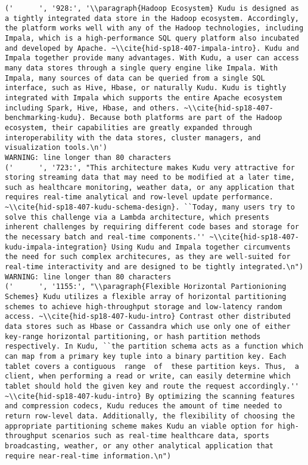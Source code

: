\begin{tiny}
\begin{verbatim}
('      ', '928:', '\\paragraph{Hadoop Ecosystem} Kudu is designed as a tightly integrated data store in the Hadoop ecosystem. Accordingly, the platform works well with any of the Hadoop technologies, including Impala, which is a high-performance SQL query platform also incubated and developed by Apache. ~\\cite{hid-sp18-407-impala-intro}. Kudu and Impala together provide many advantages. With Kudu, a user can access many data stores through a single query engine like Impala. With Impala, many sources of data can be queried from a single SQL interface, such as Hive, Hbase, or naturally Kudu. Kudu is tightly integrated with Impala which supports the entire Apache ecosystem including Spark, Hive, Hbase, and others. ~\\cite{hid-sp18-407-benchmarking-kudu}. Because both platforms are part of the Hadoop ecosystem, their capabilities are greatly expanded through interoperability with the data stores, cluster managers, and visualization tools.\n')
WARNING: line longer than 80 characters
('      ', '723:', "This architecture makes Kudu very attractive for storing streaming data that may need to be modified at a later time, such as healthcare monitoring, weather data, or any application that requires real-time analytical and row-level update performance. ~\\cite{hid-sp18-407-kudu-schema-design}. ``Today, many users try to solve this challenge via a Lambda architecture, which presents inherent challenges by requiring different code bases and storage for the necessary batch and real-time components.'' ~\\cite{hid-sp18-407-kudu-impala-integration} Using Kudu and Impala together circumvents the need for such complex architecures, as they are well-suited for real-time interactivity and are designed to be tightly integrated.\n")
WARNING: line longer than 80 characters
('      ', '1155:', "\\paragraph{Flexible Horizontal Partionioning Schemes} Kudu utilizes a flexible array of horizontal partitioning schemes to achieve high-throughput storage and low-latency random access. ~\\cite{hid-sp18-407-kudu-intro} Contrast other distributed data stores such as Hbase or Cassandra which use only one of either key-range horizontal partitioning, or hash partition methods respectively. In Kudu, ``the partition schema acts as a function which can map from a primary key tuple into a binary partition key. Each tablet covers a contiguous  range  of  these partition keys. Thus,  a client, when performing a read or write, can easily determine which tablet should hold the given key and route the request accordingly.'' ~\\cite{hid-sp18-407-kudu-intro} By optimizing the scanning features and compression codecs, Kudu reduces the amount of time needed to return row-level data. Additionally, the flexibility of choosing the appropriate partitioning scheme makes Kudu an viable option for high-throughput scenarios such as real-time healthcare data, sports broadcasting, weather, or any other analytical application that require near-real-time information.\n")

\end{verbatim}
\end{tiny}

